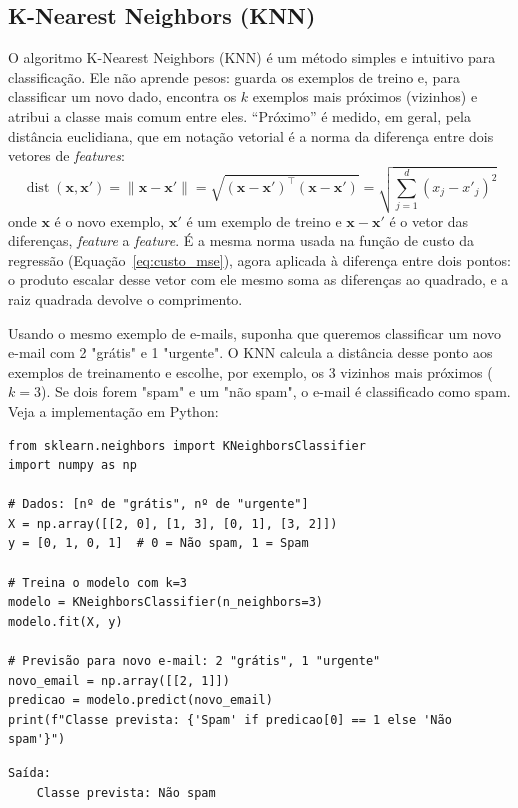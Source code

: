 \documentclass[a4paper,12pt,openany]{book}
\begin{document}
\subsection{K-Nearest Neighbors (KNN)}

O algoritmo K-Nearest Neighbors (KNN) é um método simples e intuitivo para classificação. Ele não aprende pesos: guarda os exemplos de treino e, para classificar um novo dado, encontra os \(k\) exemplos mais próximos (vizinhos) e atribui a classe mais comum entre eles. ``Próximo'' é medido, em geral, pela distância euclidiana, que em notação vetorial é a norma da diferença entre dois vetores de \textit{features}:
\begin{equation}
\operatorname{dist}(\mathbf{x}, \mathbf{x}') = \|\mathbf{x} - \mathbf{x}'\| = \sqrt{(\mathbf{x} - \mathbf{x}')^\top(\mathbf{x} - \mathbf{x}')} = \sqrt{\sum_{j=1}^{d} (x_j - x'_j)^2}
\end{equation}
onde \(\mathbf{x}\) é o novo exemplo, \(\mathbf{x}'\) é um exemplo de treino e \(\mathbf{x} - \mathbf{x}'\) é o vetor das diferenças, \textit{feature} a \textit{feature}. É a mesma norma usada na função de custo da regressão (Equação~\ref{eq:custo_mse}), agora aplicada à diferença entre dois pontos: o produto escalar desse vetor com ele mesmo soma as diferenças ao quadrado, e a raiz quadrada devolve o comprimento.

Usando o mesmo exemplo de e-mails, suponha que queremos classificar um novo e-mail com 2 "grátis" e 1 "urgente". O KNN calcula a distância desse ponto aos exemplos de treinamento e escolhe, por exemplo, os 3 vizinhos mais próximos (\(k=3\)). Se dois forem "spam" e um "não spam", o e-mail é classificado como spam. Veja a implementação em Python:

\begin{verbatim}
from sklearn.neighbors import KNeighborsClassifier
import numpy as np

# Dados: [nº de "grátis", nº de "urgente"]
X = np.array([[2, 0], [1, 3], [0, 1], [3, 2]])
y = [0, 1, 0, 1]  # 0 = Não spam, 1 = Spam

# Treina o modelo com k=3
modelo = KNeighborsClassifier(n_neighbors=3)
modelo.fit(X, y)

# Previsão para novo e-mail: 2 "grátis", 1 "urgente"
novo_email = np.array([[2, 1]])
predicao = modelo.predict(novo_email)
print(f"Classe prevista: {'Spam' if predicao[0] == 1 else 'Não spam'}")
\end{verbatim}

\begin{verbatim}
Saída:
    Classe prevista: Não spam
\end{verbatim}
\end{document}
